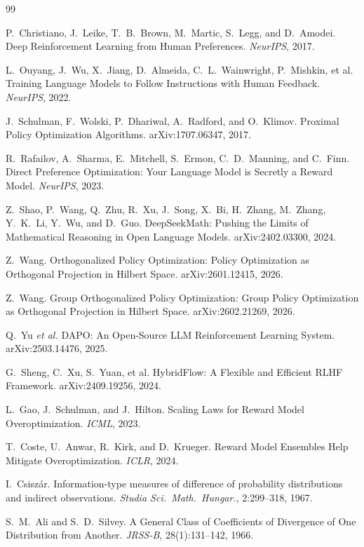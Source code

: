 \documentclass[11pt]{article}
\theoremstyle{definition}
\theoremstyle{remark}
\begin{document}
\begin{thebibliography}{99}\setlength{\itemsep}{0pt}

P.~Christiano, J.~Leike, T.~B.~Brown, M.~Martic, S.~Legg, and D.~Amodei.
Deep Reinforcement Learning from Human Preferences.
\emph{NeurIPS}, 2017.

L.~Ouyang, J.~Wu, X.~Jiang, D.~Almeida, C.~L.~Wainwright, P.~Mishkin, et al.
Training Language Models to Follow Instructions with Human Feedback.
\emph{NeurIPS}, 2022.

J.~Schulman, F.~Wolski, P.~Dhariwal, A.~Radford, and O.~Klimov.
Proximal Policy Optimization Algorithms.
arXiv:1707.06347, 2017.

R.~Rafailov, A.~Sharma, E.~Mitchell, S.~Ermon, C.~D.~Manning, and C.~Finn.
Direct Preference Optimization: Your Language Model is Secretly a Reward Model.
\emph{NeurIPS}, 2023.

Z.~Shao, P.~Wang, Q.~Zhu, R.~Xu, J.~Song, X.~Bi, H.~Zhang, M.~Zhang, Y.~K.~Li, Y.~Wu, and D.~Guo.
DeepSeekMath: Pushing the Limits of Mathematical Reasoning in Open Language Models.
arXiv:2402.03300, 2024.

Z.~Wang.
Orthogonalized Policy Optimization: Policy Optimization as Orthogonal Projection in Hilbert Space.
arXiv:2601.12415, 2026.

Z.~Wang.
Group Orthogonalized Policy Optimization: Group Policy Optimization as Orthogonal Projection in Hilbert Space.
arXiv:2602.21269, 2026.

Q.~Yu \emph{et al.}
DAPO: An Open-Source LLM Reinforcement Learning System.
arXiv:2503.14476, 2025.

G.~Sheng, C.~Xu, S.~Yuan, et al.
HybridFlow: A Flexible and Efficient RLHF Framework.
arXiv:2409.19256, 2024.

L.~Gao, J.~Schulman, and J.~Hilton.
Scaling Laws for Reward Model Overoptimization.
\emph{ICML}, 2023.

T.~Coste, U.~Anwar, R.~Kirk, and D.~Krueger.
Reward Model Ensembles Help Mitigate Overoptimization.
\emph{ICLR}, 2024.

I.~Csisz\'ar.
Information-type measures of difference of probability distributions and indirect observations.
\emph{Studia Sci.\ Math.\ Hungar.}, 2:299--318, 1967.

S.~M.~Ali and S.~D.~Silvey.
A General Class of Coefficients of Divergence of One Distribution from Another.
\emph{JRSS-B}, 28(1):131--142, 1966.

\end{thebibliography}
\end{document}
